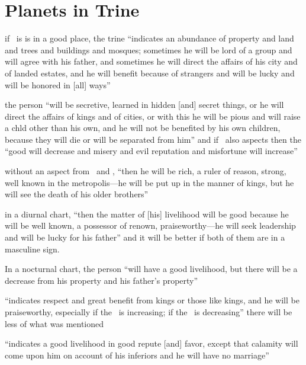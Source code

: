 \section{Planets in Trine}
\begin{description}[style=multiline,leftmargin=2.5cm]
\item[\Saturn\Trine\Jupiter] if \Jupiter\, is is in a good place, the trine  ``indicates an abundance of property and land and trees and buildings and mosques; sometimes he will be lord of a group and will agree with his father, and sometimes he will direct the affairs of his city and of landed estates, and he will benefit because of strangers and will be lucky and will be honored in [all] ways''

\item[\Saturn\Trine\Jupiter\, \& \Mercury] the person ``will be secretive, learned in hidden [and] secret things, or he will direct the affairs of kings and of cities, or with this he will be pious and will raise a chld other than his own, and he will not be benefited by his own children, because they will die or will be separated from him'' and if \Mars\, also aspects then the ``good will decrease and misery and evil reputation and misfortune will increase''

\item[\Saturn\Trine\Mars] without an aspect from \Jupiter\, and \Mercury, ``then he will be rich, a ruler of reason, strong, well known in the metropolis---he will be put up in the manner of kings, but he will see the death of his older brothers''

\item[\Saturn\Trine\Sun] in a diurnal chart, ``then the matter of [his] livelihood will be good because he will be well known, a possessor of renown, praiseworthy---he will seek leadership and will be lucky for his father'' and it will be better if both of them are in a masculine sign. 

In a nocturnal chart, the person ``will have a good livelihood, but there will be a decrease from his property and his father's property''

\item[\Saturn\Trine\Moon] ``indicates respect and great benefit from kings or those like kings, and he will be praiseworthy, especially if the \Moon\, is increasing; if the \Moon\, is decreasing'' there will be less of what was mentioned

\item[\Saturn\Trine\Venus] ``indicates a good livelihood in good repute [and] favor, except that calamity will come upon him on account of his inferiors and he will have no marriage''


\end{description}
